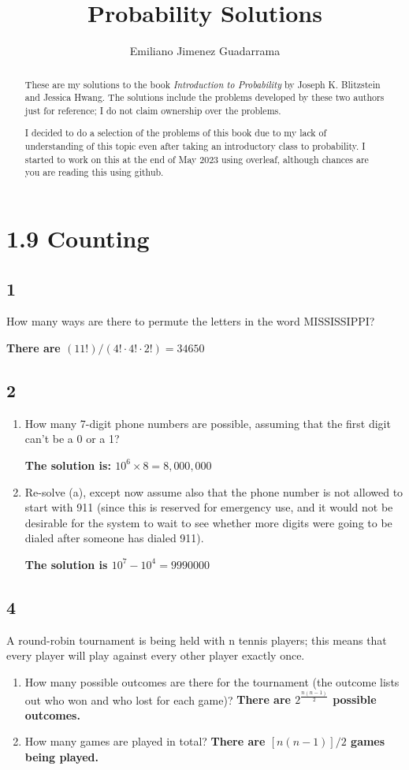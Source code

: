 \documentclass{article}
\title{Probability Solutions}
\author{Emiliano Jimenez Guadarrama}
\begin{document}
\maketitle

\begin{abstract}
These are my solutions to the book \textit{Introduction to Probability} by Joseph K. Blitzstein and Jessica Hwang. The solutions include the problems developed by these two authors just for reference; I do not claim ownership over the problems.

I decided to do a selection of the problems of this book due to my lack of understanding of this topic even after taking an introductory class to probability. I started to work on this at the end of May 2023 using overleaf, although chances are you are reading this using github.
\end{abstract}

\section{1.9 Counting}
\subsection{1}
How many ways are there to permute the letters in the word MISSISSIPPI?

\textbf{There are $(11!)/(4! \cdot 4! \cdot 2!)=34650$}
\subsection{2}
\begin{enumerate}
    \item How many 7-digit phone numbers are possible, assuming that the first digit can’t be a 0 or a 1?
    
    \textbf{The solution is: $10^6 \times 8 = 8,000,000$}
    \item Re-solve (a), except now assume also that the phone number is not allowed to start with 911 (since this is reserved for emergency use, and it would not be desirable for the system to wait to see whether more digits were going to be dialed after someone has dialed 911).
    
    \textbf{The solution is $10^7-10^4=9990000$}
\end{enumerate}
\subsection{4}
A round-robin tournament is being held with n tennis players; this means that every player will play against every other player exactly once.
\begin{enumerate}
    \item How many possible outcomes are there for the tournament (the outcome lists out who won and who lost for each game)? \textbf{There are $2^{\frac{n(n-1)}{2}}$ possible outcomes.}

    \item How many games are played in total? \textbf{There are $[n(n-1)]/2$ games being played.}
\end{enumerate}
\newpage
\end{document}

